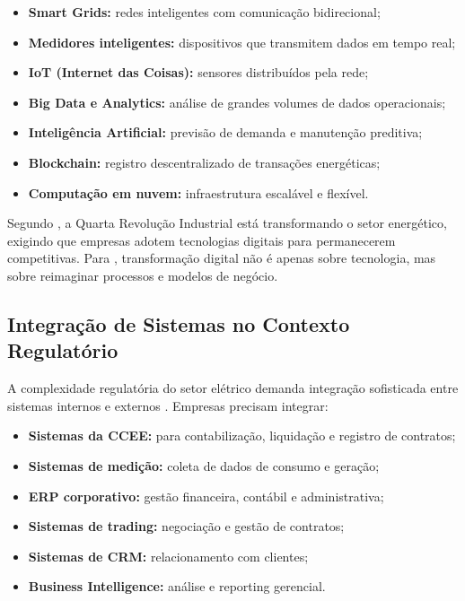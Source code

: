 \begin{itemize}
    \item \textbf{Smart Grids:} redes inteligentes com comunicação bidirecional;
    \item \textbf{Medidores inteligentes:} dispositivos que transmitem dados em tempo real;
    \item \textbf{IoT (Internet das Coisas):} sensores distribuídos pela rede;
    \item \textbf{Big Data e Analytics:} análise de grandes volumes de dados operacionais;
    \item \textbf{Inteligência Artificial:} previsão de demanda e manutenção preditiva;
    \item \textbf{Blockchain:} registro descentralizado de transações energéticas;
    \item \textbf{Computação em nuvem:} infraestrutura escalável e flexível.
\end{itemize}

Segundo \cite{schwab2016}, a Quarta Revolução Industrial está transformando o setor energético, exigindo que empresas adotem tecnologias digitais para permanecerem competitivas. Para \cite{westerman2014}, transformação digital não é apenas sobre tecnologia, mas sobre reimaginar processos e modelos de negócio.
\subsection{Integração de Sistemas no Contexto Regulatório}

A complexidade regulatória do setor elétrico demanda integração sofisticada entre sistemas internos e externos \cite{castro2015}. Empresas precisam integrar:

\begin{itemize}
    \item \textbf{Sistemas da CCEE:} para contabilização, liquidação e registro de contratos;
    \item \textbf{Sistemas de medição:} coleta de dados de consumo e geração;
    \item \textbf{ERP corporativo:} gestão financeira, contábil e administrativa;
    \item \textbf{Sistemas de trading:} negociação e gestão de contratos;
    \item \textbf{Sistemas de CRM:} relacionamento com clientes;
    \item \textbf{Business Intelligence:} análise e reporting gerencial.
\end{itemize}

